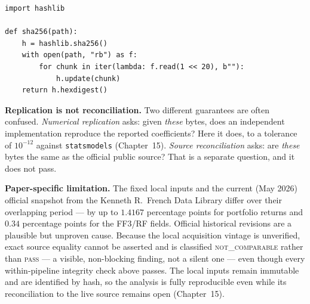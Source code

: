 \begin{verbatim}
import hashlib

def sha256(path):
    h = hashlib.sha256()
    with open(path, "rb") as f:
        for chunk in iter(lambda: f.read(1 << 20), b""):
            h.update(chunk)
    return h.hexdigest()
\end{verbatim}

\textbf{Replication is not reconciliation.} Two different guarantees are
often confused. \emph{Numerical replication} asks: given \emph{these}
bytes, does an independent implementation reproduce the reported
coefficients? Here it does, to a tolerance of $10^{-12}$ against
\texttt{statsmodels} (Chapter~15). \emph{Source reconciliation} asks: are
\emph{these} bytes the same as the official public source? That is a
separate question, and it does not pass.

\textbf{Paper-specific limitation.} The fixed local inputs and the current
(May 2026) official snapshot from the Kenneth R.\ French Data Library
differ over their overlapping period --- by up to $1.4167$ percentage
points for portfolio returns and $0.34$ percentage points for the FF3/RF
fields. Official historical revisions are a plausible but unproven cause.
Because the local acquisition vintage is unverified, exact source equality
cannot be asserted and is classified \textsc{not\_comparable} rather than
\textsc{pass} --- a visible, non-blocking finding, not a silent one --- even
though every within-pipeline integrity check above passes. The local
inputs remain immutable and are identified by hash, so the analysis is
fully reproducible even while its reconciliation to the live source
remains open (Chapter~15).

